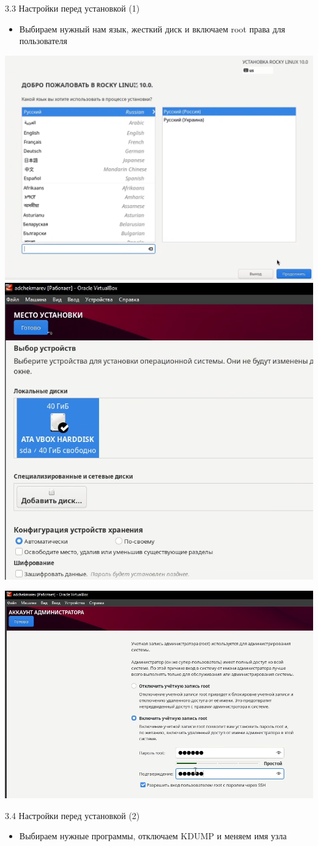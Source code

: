 \documentclass[
  ignorenonframetext,
  aspectratio=169,
  russian,
]{beamer}
\providecommand{\tightlist}{%
  \setlength{\itemsep}{0pt}\setlength{\parskip}{0pt}}
\begin{document}
\begin{frame}{3.3 Настройки перед установкой (1)}
\label{ux43dux430ux441ux442ux440ux43eux439ux43aux438-ux43fux435ux440ux435ux434-ux443ux441ux442ux430ux43dux43eux432ux43aux43eux439-1}
\begin{itemize}
\tightlist
\item
  Выбираем нужный нам язык, жесткий диск и включаем root права для
  пользователя
\end{itemize}

\includegraphics[width=0.35\linewidth,height=\textheight,keepaspectratio]{image/Рис 1.5.png}
\includegraphics[width=0.35\linewidth,height=\textheight,keepaspectratio]{image/Рис 1.8.png}

\includegraphics[width=0.35\linewidth,height=\textheight,keepaspectratio]{image/Рис 1.10.png}
\end{frame}

\begin{frame}{3.4 Настройки перед установкой (2)}
\label{ux43dux430ux441ux442ux440ux43eux439ux43aux438-ux43fux435ux440ux435ux434-ux443ux441ux442ux430ux43dux43eux432ux43aux43eux439-2}
\begin{itemize}
\tightlist
\item
  Выбираем нужные программы, отключаем KDUMP и меняем имя узла
\end{itemize}
\end{frame}
\end{document}
